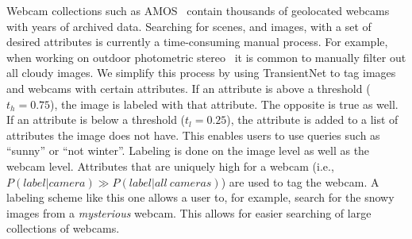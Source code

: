\documentclass[10pt,twocolumn,letterpaper]{article}
\begin{document}
Webcam collections such as AMOS~\cite{jacobs07amos} contain thousands of
geolocated webcams with years of archived data.  Searching for scenes, and
images, with a set of desired attributes is currently a time-consuming manual
process. For example, when working on outdoor photometric
stereo~\cite{abramsheliometric} it is common to manually filter out all cloudy
images. We simplify this process by using TransientNet to tag images and
webcams with certain attributes.  If an attribute is above a threshold ($t_h =
0.75$), the image is labeled with that attribute.  The opposite is true as
well. If an attribute is below a threshold ($t_l = 0.25$), the attribute is
added to a list of attributes the image does not have. This enables users to
use queries such as ``sunny'' or ``not winter''. Labeling is done on the image
level as well as the webcam level. Attributes that are uniquely high for a
webcam (i.e., $P(label|camera)\gg P(label|all\ cameras)$) are used to tag the
webcam. A labeling scheme like this one allows a user to, for example, search
for the snowy images from a \textit{mysterious} webcam. This allows for easier
searching of large collections of webcams.
\end{document}
